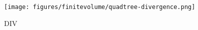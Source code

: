 \begin{figure}[ht]
    \centering
    \texttt{[image: figures/finitevolume/quadtree-divergence.png]}
    \caption{DIV}
    \label{fig:finitevolume-quadtree-divergence}
\end{figure}
